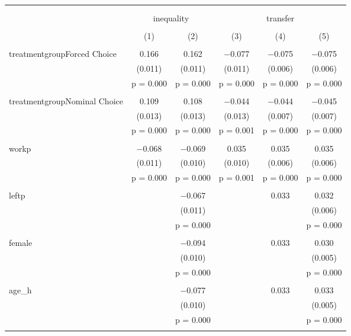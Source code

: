 
\begin{table}[!htbp] \centering 
  \caption{} 
  \label{tbl:o:trans} 
\begin{tabular}{@{\extracolsep{5pt}}lccccc} 
\\[-1.8ex]\hline 
\hline \\[-1.8ex] 
\\[-1.8ex] & \multicolumn{2}{c}{inequality} & \multicolumn{3}{c}{transfer} \\ 
\\[-1.8ex] & (1) & (2) & (3) & (4) & (5)\\ 
\hline \\[-1.8ex] 
 treatmentgroupForced Choice & 0.166 & 0.162 & $-$0.077 & $-$0.075 & $-$0.075 \\ 
  & (0.011) & (0.011) & (0.011) & (0.006) & (0.006) \\ 
  & p = 0.000 & p = 0.000 & p = 0.000 & p = 0.000 & p = 0.000 \\ 
  & & & & & \\ 
 treatmentgroupNominal Choice & 0.109 & 0.108 & $-$0.044 & $-$0.044 & $-$0.045 \\ 
  & (0.013) & (0.013) & (0.013) & (0.007) & (0.007) \\ 
  & p = 0.000 & p = 0.000 & p = 0.001 & p = 0.000 & p = 0.000 \\ 
  & & & & & \\ 
 workp & $-$0.068 & $-$0.069 & 0.035 & 0.035 & 0.035 \\ 
  & (0.011) & (0.010) & (0.010) & (0.006) & (0.006) \\ 
  & p = 0.000 & p = 0.000 & p = 0.001 & p = 0.000 & p = 0.000 \\ 
  & & & & & \\ 
 leftp &  & $-$0.067 &  & 0.033 & 0.032 \\ 
  &  & (0.011) &  &  & (0.006) \\ 
  &  & p = 0.000 &  &  & p = 0.000 \\ 
  & & & & & \\ 
 female &  & $-$0.094 &  & 0.033 & 0.030 \\ 
  &  & (0.010) &  &  & (0.005) \\ 
  &  & p = 0.000 &  &  & p = 0.000 \\ 
  & & & & & \\ 
 age\_h &  & $-$0.077 &  & 0.033 & 0.033 \\ 
  &  & (0.010) &  &  & (0.005) \\ 
  &  & p = 0.000 &  &  & p = 0.000 \\ 
  & & & & & \\ 

\end{tabular}
\end{table}
